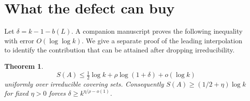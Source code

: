 \documentclass[10pt]{article}
\newtheorem{theorem}{Theorem}
\begin{document}



\section{What the defect can buy}
Let $\delta=k-1-b(L)$. A companion manuscript \cite{parallel} proves the following inequality with error $O(\log\log k)$. We give a separate proof of the leading interpolation to identify the contribution that can be attained after dropping irreducibility.
\begin{theorem}\label{def}
\[
 S(A)\le \tfrac12\log k+\rho\log(1+\delta)+o(\log k)
\]
uniformly over irreducible covering sets. Consequently $S(A)\ge(1/2+\eta)\log k$ for fixed $\eta>0$ forces $\delta\ge k^{\eta/\rho-o(1)}$.
\end{theorem}
\end{document}
